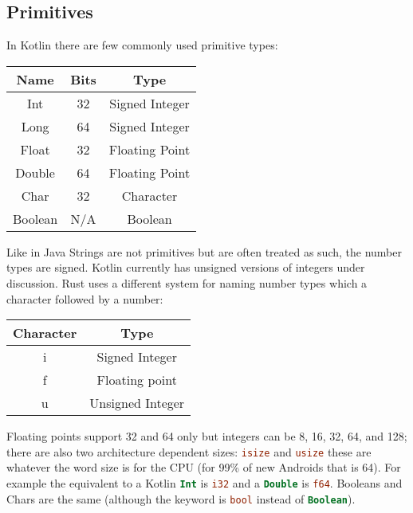 \documentclass[a4paper,11pt]{article}
\begin{document}
\subsection{Primitives}
In Kotlin there are few commonly used primitive types:

\begin{center}
\begin{tabular}{ |c|c|c| } 
 \hline
 Name & Bits & Type \\ 
 \hline
 Int & 32 & Signed Integer \\ 
 Long & 64 & Signed Integer \\ 
 Float & 32 & Floating Point \\ 
 Double & 64 & Floating Point \\ 
 Char & 32 & Character \\ 
 Boolean & N/A & Boolean \\ 
 \hline
\end{tabular}
\end{center}

Like in Java Strings are not primitives but are often treated as such, the number types are signed.
Kotlin currently has unsigned versions of integers under discussion.
\newline
\newline
Rust uses a different system for naming number types which a character followed by a number:

\begin{center}
\begin{tabular}{ |c|c| } 
 \hline
 Character & Type \\ 
 \hline
 i & Signed Integer \\ 
 f & Floating point \\ 
 u & Unsigned Integer \\ 
 \hline
\end{tabular}
\end{center}
Floating points support 32 and 64 only but integers can be 8, 16, 32, 64, and 128; there are also two architecture dependent sizes: \lstinline[language=Rust]{isize} and \lstinline[language=Rust]{usize} these are whatever the word size is for the CPU (for 99\% of new Androids that is 64). For example the equivalent to a Kotlin \lstinline[language=Kotlin]{Int} is \lstinline[language=Rust]{i32} and a \lstinline[language=Kotlin]{Double} is \lstinline[language=Rust]{f64}.
\newline
Booleans and Chars are the same (although the keyword is \lstinline[language=Rust]{bool} instead of \lstinline[language=Kotlin]{Boolean}).
\end{document}
